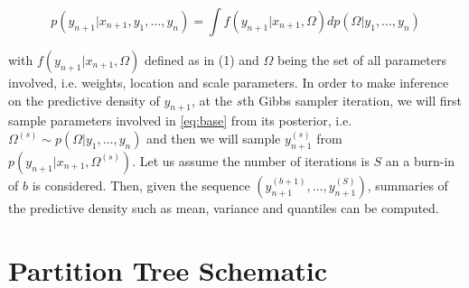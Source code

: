 \begin{equation}p(y_{n+1}|x_{n+1}, y_1, \ldots, y_n) = \int f\left(y_{n+1}|x_{n+1},\Omega\right) dp\left(\Omega|y_1, \ldots, y_n\right) \label{predictive:MSB}\end{equation}

with $f\left(y_{n+1}|x_{n+1},\Omega\right)$ defined as in (1) and $\Omega$ being the set of all parameters involved, i.e. weights, location and scale parameters. In order to make inference on the predictive density of $y_{n+1}$, at the $s$th  Gibbs sampler iteration, we will first sample parameters involved in \ref{eq:base} from its posterior, i.e. $\Omega^{(s)} \sim p\left(\Omega|y_1, \ldots, y_n\right)$ and then we will sample $y^{(s)}_{n+1}$ from $ p\left(y_{n+1}|x_{n+1},\Omega^{(s)}\right)$. Let us assume the number of iterations is $S$ an a burn-in of $b$ is considered. Then, given the sequence $\left(y^{(b+1)}_{n+1}, \ldots, y^{(S)}_{n+1}\right)$, summaries of the predictive density such as mean, variance and quantiles can be computed. 



\section{Partition Tree Schematic}


